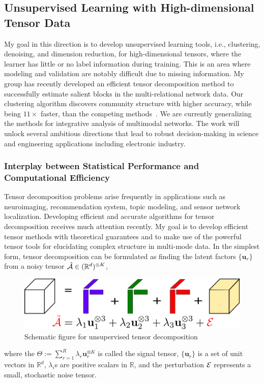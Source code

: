 \documentclass[10pt]{article}
\theoremstyle{definition}
\theoremstyle{definition}
\theoremstyle{definition}
\begin{document}
\begin{enumerate}
\subsection{Unsupervised Learning with High-dimensional Tensor Data}\label{sec:aim2}
My goal in this direction is to develop unsupervised learning tools, i.e., clustering, denoising, and dimension reduction, for high-dimensional tensors, where the learner has little or no label information during training. This is an area where modeling and validation are notably difficult due to missing information. My group has recently developed an efficient tensor decomposition method to successfully estimate salient blocks in the multi-relational network data. Our clustering algorithm discovers community structure with higher accuracy, while being $11\times$ faster, than the competing methods~\cite{wang2019three,zeng2019multiway,wang2018learning}. We are currently generalizing the methods for integrative analysis of multimodal networks. The work will unlock several ambitious directions that lead to robust decision-making in science and engineering applications including electronic industry.  


\subsubsection{Interplay between Statistical Performance and Computational Efficiency}
Tensor decomposition problems arise frequently in applications such as neuroimaging, recommendation system, topic modeling, and sensor network localization. Developing efficient and accurate algorithms for tensor decomposition receives much attention recently. My goal is to develop efficient tensor methods with theoretical guarantees and to make use of the powerful tensor tools for elucidating complex structure in multi-mode data. In the simplest form, tensor decomposition can be formulated as finding the latent factors $\{\mathbf{u}_r\}$ from a noisy tensor $\hat {\mathcal{A}}\in(\mathbb{R}^{d})^{\otimes K}$,
\begin{figure}[H]
\centering
\includegraphics[width=.5\textwidth]{nearly_SOD2.pdf}
\caption{Schematic figure for unsupervised tensor decomposition}\label{fig:3}
\vspace{-.5cm}
\end{figure}
where the $\Theta:=\sum_{r=1}^R \lambda_r \mathbf{u}_r^{\otimes K}$ is called the signal tensor, $\{\mathbf{u}_r\}$ is a set of unit vectors in $\mathbb{R}^d$, $\lambda_i$s are positive scalars in $\mathbb{R}$, and the perturbation $\mathcal{E}$ represents a small, stochastic noise tensor. 


\end{enumerate}
\end{document}
